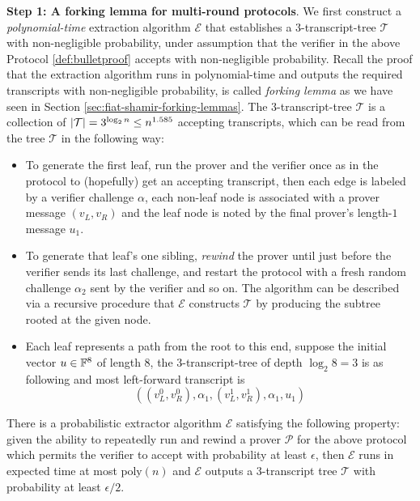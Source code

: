 \documentclass{article}
\begin{document}
\textbf{Step 1: A forking lemma for multi-round protocols}. We first construct a \textit{polynomial-time} extraction algorithm $\mathcal{E}$ that establishes a $3$-transcript-tree $\mathcal{T}$ with non-negligible probability, under assumption that the verifier in the above Protocol \ref{def:bulletproof} accepts with non-negligible probability. Recall the proof that the extraction algorithm runs in polynomial-time and outputs the required transcripts with non-negligible probability, is called \textit{forking lemma} as we have seen in Section \ref{sec:fiat-shamir-forking-lemmas}. The $3$-transcript-tree $\mathcal{T}$ is a collection of $\abs{\mathcal{T}} = 3^{\log_2 n} \leq n^{1.585}$ accepting transcripts, which can be read from the tree $\mathcal{T}$ in the following way: 
\begin{itemize}
\item To generate the first leaf, run the prover and the verifier once as in the protocol to (hopefully) get an accepting transcript, then each edge is labeled by a verifier challenge $\alpha$, each non-leaf node is associated with a prover message $(v_L, v_R)$ and the leaf node is noted by the final prover's length-$1$ message $u_1$. 
\item To generate that leaf's one sibling, \textit{rewind} the prover until just before the verifier sends its last challenge, and restart the protocol with a fresh random challenge $\alpha_2$ sent by the verifier and so on. The algorithm can be described via a recursive procedure that $\mathcal{E}$ constructs $\mathcal{T}$ by producing the subtree rooted at the given node. 
\item Each leaf represents a path from the root to this end, suppose the initial vector $u \in \mathbb{F}^{8}$ of length $8$, the $3$-transcript-tree of depth $\log_2 8 = 3$ is as following and most left-forward transcript is
\begin{equation*}
\left( (v_L^0, v_{R}^0), \alpha_1, (v_L^{1}, v_{R}^1), \alpha_1, u_{1} \right)
\end{equation*}
\end{itemize}

\begin{theorem}
There is a probabilistic extractor algorithm $\mathcal{E}$ satisfying the following property: given the ability to repeatedly run and rewind a prover $\mathcal{P}$ for the above protocol which permits the verifier to accept with probability at least $\epsilon$, then $\mathcal{E}$ runs in expected time at most $\text{poly}(n)$ and $\mathcal{E}$ outputs a $3$-transcript tree $\mathcal{T}$ with probability at least $\epsilon/2$. 
\end{theorem}
\end{document}
